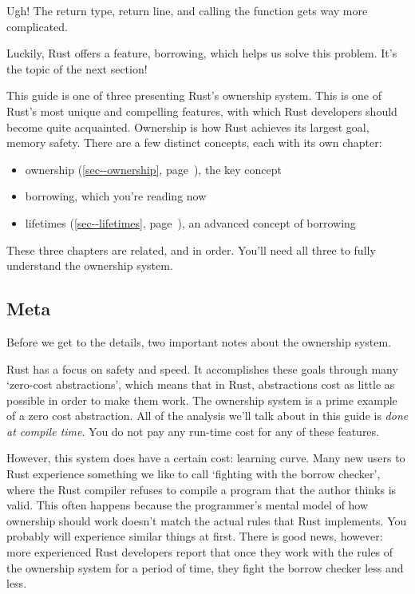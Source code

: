 \documentclass[a4paper,]{book}
\renewcommand*{\hyperref}[2][\ar]{%
  \def\ar{#2}%
  #2 (\autoref{#1}, page~\pageref{#1})}
\providecommand{\tightlist}{%
  \setlength{\itemsep}{0pt}\setlength{\parskip}{0pt}}
\begin{document}
Ugh! The return type, return line, and calling the function gets way
more complicated.

Luckily, Rust offers a feature, borrowing, which helps us solve this
problem. It's the topic of the next section!


This guide is one of three presenting Rust's ownership system. This is
one of Rust's most unique and compelling features, with which Rust
developers should become quite acquainted. Ownership is how Rust
achieves its largest goal, memory safety. There are a few distinct
concepts, each with its own chapter:

\begin{itemize}
\tightlist
\item
  \hyperref[sec--ownership]{ownership}, the key concept
\item
  borrowing, which you're reading now
\item
  \hyperref[sec--lifetimes]{lifetimes}, an advanced concept of borrowing
\end{itemize}

These three chapters are related, and in order. You'll need all three to
fully understand the ownership system.

\subsection{Meta}\label{meta-1}

Before we get to the details, two important notes about the ownership
system.

Rust has a focus on safety and speed. It accomplishes these goals
through many `zero-cost abstractions', which means that in Rust,
abstractions cost as little as possible in order to make them work. The
ownership system is a prime example of a zero cost abstraction. All of
the analysis we'll talk about in this guide is \emph{done at compile
time}. You do not pay any run-time cost for any of these features.

However, this system does have a certain cost: learning curve. Many new
users to Rust experience something we like to call `fighting with the
borrow checker', where the Rust compiler refuses to compile a program
that the author thinks is valid. This often happens because the
programmer's mental model of how ownership should work doesn't match the
actual rules that Rust implements. You probably will experience similar
things at first. There is good news, however: more experienced Rust
developers report that once they work with the rules of the ownership
system for a period of time, they fight the borrow checker less and
less.
\end{document}
